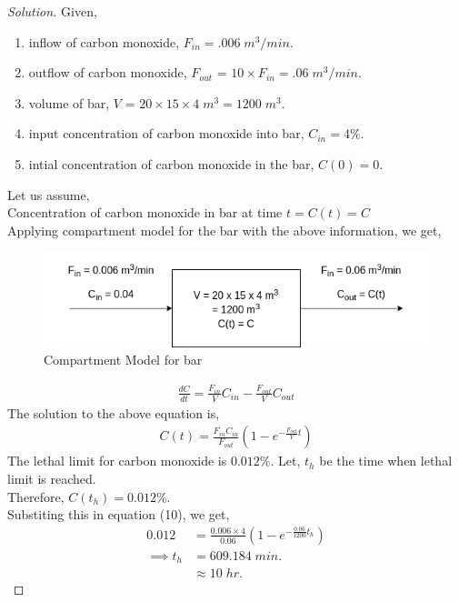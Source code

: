 \documentclass{article}
\newenvironment{solution}
{\renewcommand\qedsymbol{$\blacksquare$}\begin{proof}[Solution]}{\end{proof}}
\begin{document}
\begin{solution}
Given,
\begin{enumerate}
\item inflow of carbon monoxide, $F_{in} = .006 \; m^3/min$.
\item outflow of carbon monoxide, $F_{out}$ = $10 \times F_{in} = .06 \; m^3/min$.
\item volume of bar, $V$ = $20 \times 15 \times 4 \; m^3 = 1200 \; m^3$.
\item input concentration of carbon monoxide into bar, $C_{in} = 4\%$.
\item intial concentration of carbon monoxide in the bar, $C(0) = 0$.
\end{enumerate}
Let us assume,\\
Concentration of carbon monoxide in bar at time $t = C(t) = C$\\
Applying compartment model for the bar with the above information, we get,\\

\begin{figure}[H]
\caption{Compartment Model for bar}
\centering
\includegraphics[width=1.0\textwidth]{"Problem 4"}
\end{figure}

\begin{equation}
\begin{split}
\frac{dC}{dt} = \frac{F_{in}}{V}C_{in}-\frac{F_{out}}{V}C_{out}
\end{split}
\end{equation}
The solution to the above equation is,
\begin{equation}
\begin{split}
C(t) = \frac{F_{in}C_{in}}{F_{out}}\left(1-e^{-\frac{F_{out}}{V}t}\right)
\end{split}
\end{equation}
The lethal limit for carbon monoxide is $0.012\%$. Let, $t_h$ be the time when lethal limit is reached.\\
Therefore, $C(t_h) = 0.012\%$.\\
Substiting this in equation (10), we get,\\
\begin{equation}
\begin{split}
0.012 &= \frac{0.006 \times 4}{0.06}\left(1-e^{-\frac{0.06}{1200}t_h}\right)\\
\implies t_h &= 609.184 \; min. \\
&\approx \boxed{10 \; hr.}
\end{split}
\end{equation}



\end{solution}
\end{document}
